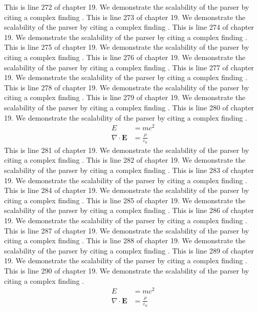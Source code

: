 This is line 272 of chapter 19. We demonstrate the scalability of the parser by citing a complex finding \cite{ref19_272}.
This is line 273 of chapter 19. We demonstrate the scalability of the parser by citing a complex finding \cite{ref19_273}.
This is line 274 of chapter 19. We demonstrate the scalability of the parser by citing a complex finding \cite{ref19_274}.
This is line 275 of chapter 19. We demonstrate the scalability of the parser by citing a complex finding \cite{ref19_275}.
This is line 276 of chapter 19. We demonstrate the scalability of the parser by citing a complex finding \cite{ref19_276}.
This is line 277 of chapter 19. We demonstrate the scalability of the parser by citing a complex finding \cite{ref19_277}.
This is line 278 of chapter 19. We demonstrate the scalability of the parser by citing a complex finding \cite{ref19_278}.
This is line 279 of chapter 19. We demonstrate the scalability of the parser by citing a complex finding \cite{ref19_279}.
This is line 280 of chapter 19. We demonstrate the scalability of the parser by citing a complex finding \cite{ref19_280}.
\begin{align*}
  E &= mc^2 \\
  \nabla \cdot \mathbf{E} &= \frac{\rho}{\varepsilon_0}
\end{align*}
This is line 281 of chapter 19. We demonstrate the scalability of the parser by citing a complex finding \cite{ref19_281}.
This is line 282 of chapter 19. We demonstrate the scalability of the parser by citing a complex finding \cite{ref19_282}.
This is line 283 of chapter 19. We demonstrate the scalability of the parser by citing a complex finding \cite{ref19_283}.
This is line 284 of chapter 19. We demonstrate the scalability of the parser by citing a complex finding \cite{ref19_284}.
This is line 285 of chapter 19. We demonstrate the scalability of the parser by citing a complex finding \cite{ref19_285}.
This is line 286 of chapter 19. We demonstrate the scalability of the parser by citing a complex finding \cite{ref19_286}.
This is line 287 of chapter 19. We demonstrate the scalability of the parser by citing a complex finding \cite{ref19_287}.
This is line 288 of chapter 19. We demonstrate the scalability of the parser by citing a complex finding \cite{ref19_288}.
This is line 289 of chapter 19. We demonstrate the scalability of the parser by citing a complex finding \cite{ref19_289}.
This is line 290 of chapter 19. We demonstrate the scalability of the parser by citing a complex finding \cite{ref19_290}.
\begin{align*}
  E &= mc^2 \\
  \nabla \cdot \mathbf{E} &= \frac{\rho}{\varepsilon_0}
\end{align*}
